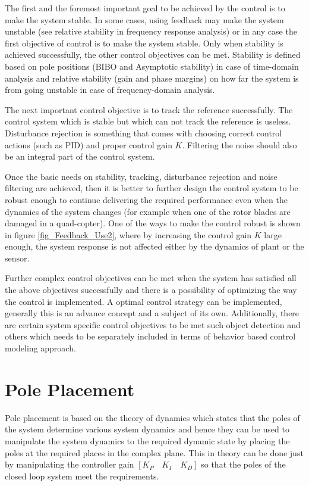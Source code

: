 The first and the foremost important goal to be achieved by the control is to make the system stable. In some cases, using feedback may make the system unstable (see relative stability in frequency response analysis) or in any case the first objective of control is to make the system stable. Only when stability is achieved successfully, the other control objectives can be met. Stability is defined based on pole positions (BIBO and Asymptotic stability) in case of time-domain analysis and relative stability (gain and phase margins) on how far the system is from going unstable in case of frequency-domain analysis.

The next important control objective is to track the reference successfully. The control system which is stable but which can not track the reference is useless. Disturbance rejection is something that comes with choosing correct control actions (such as PID) and proper control gain $K$. Filtering the noise should also be an integral part of the control system.

Once the basic needs on stability, tracking, disturbance rejection and noise filtering are achieved, then it is better to further design the control system to be robust enough to continue delivering the required performance even when  the dynamics of the system changes (for example when one of the rotor blades are damaged in a quad-copter). One of the ways to make the control robust is shown in figure \ref{fig_Feedback_Use2}, where by increasing the control gain $K$ large enough, the system response is not affected either by the dynamics of plant or the sensor.

Further complex control objectives can be met when the system has satisfied all the above objectives successfully and there is a possibility of optimizing the way the control is implemented. A optimal control strategy can be implemented, generally  this is an advance concept and a subject of its own. Additionally, there are certain system specific control objectives to be met such object detection and others which needs to be separately included in terms of behavior based control modeling approach.

\section{Pole Placement} \label{Sec_PolePlacement}

Pole placement is based on the theory of dynamics which states that the poles of the system determine various system dynamics and hence they can be used to manipulate the system dynamics to the required dynamic state by placing the poles at the required places in the complex plane. This in theory can be done just by manipulating the controller gain $[K_P \quad K_I \quad K_D]$ so that the poles of the closed loop system meet the requirements.

